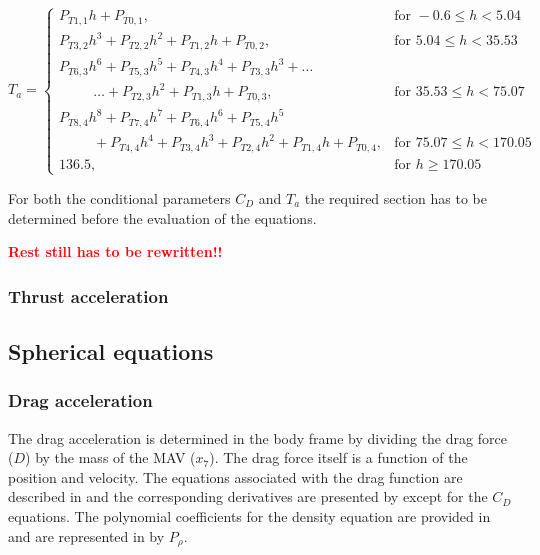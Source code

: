 \begin{equation}\label{eq:tempCondAux}
T_{a}=\begin{cases}
P_{T 1,1}h+P_{T 0,1}, & \text{for } -0.6 \leq h < 5.04  \\
P_{T 3,2}h^{3}+P_{T 2,2}h^{2}+P_{T 1,2}h+P_{T 0,2}, &  \text{for } 5.04 \leq h < 35.53   \\
P_{T 6,3}h^{6}+P_{T 5,3}h^{5}+P_{T 4,3}h^{4}+P_{T 3,3}h^{3}+ \dots \\
\qquad\ \ \dotsc +P_{T 2,3}h^{2}+P_{T 1,3}h+P_{T 0,3}, &  \text{for } 35.53 \leq h < 75.07   \\
P_{T 8,4}h^{8}+P_{T 7,4}h^{7}+P_{T 6,4}h^{6}+P_{T 5,4}h^{5} \\
\qquad\ \ +P_{T 4,4}h^{4}+P_{T 3,4}h^{3}+P_{T 2,4}h^{2}+P_{T 1,4}h+P_{T 0,4}, &  \text{for } 75.07 \leq h < 170.05   \\
136.5, &  \text{for }  h \geq 170.05   
\end{cases}
\end{equation}

For both the conditional parameters $C_{D}$ and $T_{a}$  the required section has to be determined before the evaluation of the equations.

 \textbf{\textcolor{red}{Rest still has to be rewritten!!}}

\subsubsection{Thrust acceleration}
\label{subsubsec:tsiDrag}

\subsection{Spherical equations}
\label{subsec:sphereq}
 
 \subsubsection{Drag acceleration}
 \label{subsubsec:tsiDrag}
The drag acceleration is determined in the body frame by dividing the drag force ($D$) by the mass of the \ac{MAV} ($x_{7}$). The drag force itself is a function of the position and velocity. The equations associated with the drag function are described in  and the corresponding derivatives are presented by  except for the $C_{D}$ equations. The polynomial coefficients for the density equation are provided in  and are represented in  by $P_{\rho}$.

